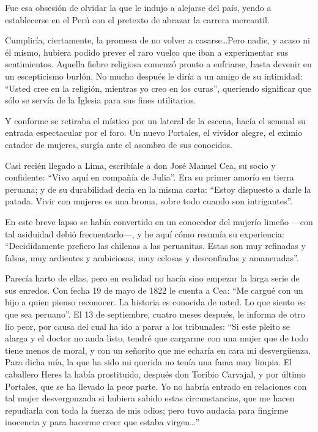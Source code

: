 \documentclass[10pt,twoside,openright]{memoir}
\begin{document}
Fue esa obsesión de olvidar la que le indujo a alejarse del país, yendo
a establecerse en el Perú con el pretexto de abrazar la carrera
mercantil.

Cumpliría, ciertamente, la promesa de no volver a casarse\ldots Pero
nadie, y acaso ni él mismo, hubiera podido prever el raro vuelco que
iban a experimentar sus sentimientos. Aquella fiebre religiosa comenzó
pronto a enfriarse, hasta devenir en
un escepticismo burlón. No mucho después le diría a un amigo de su
intimidad: ``Usted cree en la religión, mientras yo creo en los curas'', queriendo
significar que sólo se servía de la Iglesia para sus fines utilitarios.

Y conforme se retiraba el místico por un lateral de la escena, hacía el
sensual su entrada espectacular por
el foro. Un nuevo Portales, el vividor alegre, el eximio catador de
mujeres, surgía ante el asombro de sus conocidos.

Casi recién llegado a Lima, escribíale a don José Manuel Cea, su socio y confidente:
``Vivo aquí en compañía de Julia''. Era su primer amorío en tierra
peruana; y de su durabilidad decía en la misma carta: ``Estoy dispuesto a
darle la patada. Vivir con mujeres es una broma, sobre todo cuando son
intrigantes''.

En este breve lapso se había convertido en un conocedor del mujerío
limeño ---con tal asiduidad debió frecuentarlo---, y he aquí cómo
resumía su experiencia: ``Decididamente prefiero las chilenas a las
peruanitas. Estas son muy refinadas y falsas, muy ardientes y
ambiciosas, muy celosas y desconfiadas y amaneradas''.

Parecía harto de ellas, pero en
realidad no hacía sino empezar la larga serie de sus enredos. Con fecha
 19 de mayo de 1822 le cuenta a Cea:
``Me cargué con un hijo a quien pienso reconocer. La historia es conocida
de usted. Lo que siento es que sea peruano''. El 13 de septiembre, cuatro
meses después, le informa de otro
lío peor, por causa del cual ha ido a parar a los tribunales: ``Si este
pleito se alarga y el doctor no anda listo, tendré que cargarme con una
mujer que de todo tiene menos de moral, y con un señorito que me echaría
en cara mi desvergüenza. Para dicha mía, la que ha sido mi querida no
tenía una fama muy limpia. El caballero Heres la había prostituido,
después don Toribio Carvajal, y por último Portales, que se ha llevado
la peor parte. Yo no habría entrado en relaciones con tal mujer
desvergonzada si hubiera sabido
estas circunstancias, que me hacen repudiarla con toda la fuerza de mis
odios; pero tuvo audacia para fingirme inocencia y para hacerme creer
que estaba virgen\ldots''
\end{document}
